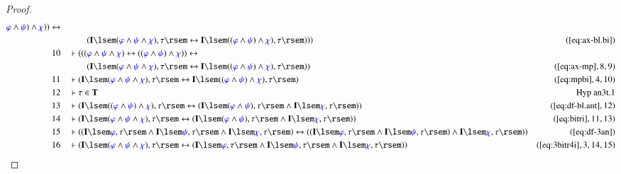 \begin{proof}
\begin{align}
      \mw{\varphi} \wedge \mw{\psi} ) \wedge \mw{\chi} ) )
      \leftrightarrow  \notag \\ & & & \qquad
      ( \mathbf{I} \lsem ( \mw{\varphi}
      \wedge \mw{\psi} \wedge \mw{\chi} ) , \tau \rsem
      \leftrightarrow \mathbf{I} \lsem ( ( \mw{\varphi}
      \wedge \mw{\psi} ) \wedge \mw{\chi} ) , \tau \rsem )
      ) )&(\mbox{\ref{eq:ax-bl.bi}})\notag
  \\ 10 &&  & \vdash ( ( ( \mw{\varphi} \wedge \mw{\psi} \wedge \mw{\chi} )
      \leftrightarrow ( ( \mw{\varphi} \wedge \mw{\psi} )
      \wedge \mw{\chi} ) ) \leftrightarrow  \notag \\ & & & \qquad
      ( \mathbf{I}
      \lsem ( \mw{\varphi} \wedge \mw{\psi} \wedge
      \mw{\chi} ) , \tau \rsem \leftrightarrow \mathbf{I}
      \lsem ( ( \mw{\varphi} \wedge \mw{\psi} ) \wedge
      \mw{\chi} ) , \tau \rsem )
      )&(\mbox{\ref{eq:ax-mp}},8,9)\notag
  \\ 11 &&  & \vdash ( \mathbf{I} \lsem ( \mw{\varphi} \wedge \mw{\psi} \wedge
      \mw{\chi} ) , \tau \rsem \leftrightarrow \mathbf{I}
      \lsem ( ( \mw{\varphi} \wedge \mw{\psi} ) \wedge
      \mw{\chi} ) , \tau \rsem
      )&(\mbox{\ref{eq:mpbi}},4,10)\notag
  \\ 12 &&  & \vdash \tau \in \mathbf{T}&\text{Hyp~an3t.1}\notag%
  \\ 13 &&  & \vdash ( \mathbf{I} \lsem ( ( \mw{\varphi} \wedge \mw{\psi} )
      \wedge \mw{\chi} ) , \tau \rsem \leftrightarrow (
      \mathbf{I} \lsem ( \mw{\varphi} \wedge \mw{\psi} ) ,
      \tau \rsem \wedge \mathbf{I} \lsem \mw{\chi} , \tau
      \rsem ) )&(\mbox{\ref{eq:df-bl.ant}},12)\notag
  \\ 14 &&  & \vdash ( \mathbf{I} \lsem ( \mw{\varphi} \wedge \mw{\psi} \wedge
      \mw{\chi} ) , \tau \rsem \leftrightarrow ( \mathbf{I}
      \lsem ( \mw{\varphi} \wedge \mw{\psi} ) , \tau \rsem
      \wedge \mathbf{I} \lsem \mw{\chi} , \tau \rsem )
      )&(\mbox{\ref{eq:bitri}},11,13)\notag
  \\ 15 &&  & \vdash ( ( \mathbf{I} \lsem \mw{\varphi} , \tau \rsem \wedge
      \mathbf{I} \lsem \mw{\psi} , \tau \rsem \wedge
      \mathbf{I} \lsem \mw{\chi} , \tau \rsem )
      \leftrightarrow ( ( \mathbf{I} \lsem \mw{\varphi} ,
      \tau \rsem \wedge \mathbf{I} \lsem \mw{\psi} , \tau
      \rsem ) \wedge \mathbf{I} \lsem \mw{\chi} , \tau
      \rsem ) )&(\mbox{\ref{eq:df-3an}})\notag
  \\ 16 &&  & \vdash ( \mathbf{I} \lsem ( \mw{\varphi} \wedge \mw{\psi} \wedge
      \mw{\chi} ) , \tau \rsem \leftrightarrow ( \mathbf{I}
      \lsem \mw{\varphi} , \tau \rsem \wedge \mathbf{I}
      \lsem \mw{\psi} , \tau \rsem \wedge \mathbf{I} \lsem
      \mw{\chi} , \tau \rsem )
      )&(\mbox{\ref{eq:3bitr4i}},3,14,15)\notag
\end{align}
\end{proof}

